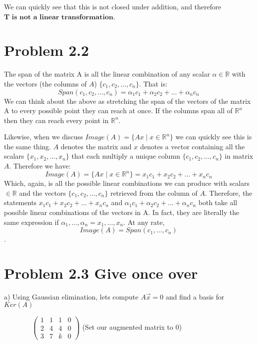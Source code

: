 \documentclass{article}
\begin{document}
We can quickly see that this is not closed under addition, and therefore $\textbf{T is not a linear transformation}$. 

\break
\section{Problem 2.2}
The span of the matrix A is all the linear combination of any scalar $\alpha \in \mathbb{R}$ with the vectors (the columns of $A$) $\{c_1,c_2,\dots,c_n\}$. That is:
\begin{equation}
    Span(c_1, c_2,\dots,c_n) = \alpha _1c_1 + \alpha _2c_2 + \dots + \alpha _nc_n
\end{equation}
We can think about the above as stretching the span of the vectors of the matrix A to every possible point they can reach at once. If the columns span all of $\mathbb{R}^n$ then they can reach every point in $\mathbb{R}^n$. 
\par
Likewise, when we discuss $Image(A) = \{Ax \mid x \in \mathbb{R}^n\}$ we can quickly see this is the same thing. $A$ denotes the matrix and $x$ denotes a vector containing all the scalars $\{x_1,x_2,\dots,x_n\}$ that each multiply a unique column $\{c_1,c_2,\dots,c_n\}$ in matrix $A$. Therefore we have:
\begin{equation}
    Image(A) = \{Ax \mid x \in \mathbb{R}^n\} = x_1c_1 + x_2c_2 + \dots + x_nc_n
\end{equation}
Which, again, is all the possible linear combinations we can produce with scalars $\in \mathbb{R}$ and the vectors $\{c_1,c_2,\dots,c_n\}$ retrieved from the column of $A$. Therefore, the statements $x_1c_1 + x_2c_2 + \dots + x_nc_n$ and $\alpha _1c_1 + \alpha _2c_2 + \dots + \alpha _nc_n$ both take all possible linear combinations of the vectors in A. In fact, they are literally the same expression if $\alpha _1,\dots,\alpha _n = x_1,\dots,x_n$. At any rate, $$Image(A) = Span(c_1,\dots,c_n)$$.

\break
\section{Problem 2.3 Give once over}
a) Using Gaussian elimination, lets compute $A\vec{x} =0$ and find a basis for $Ker(A)$

\(\qquad \qquad  \begin{pmatrix}
    1 & 1 & 1 & 0 \\
    2 & 4 & 4 & 0 \\
    3 & 7 & k & 0 
\end{pmatrix} 
 \) (Set our augmented matrix to 0)
\end{document}
